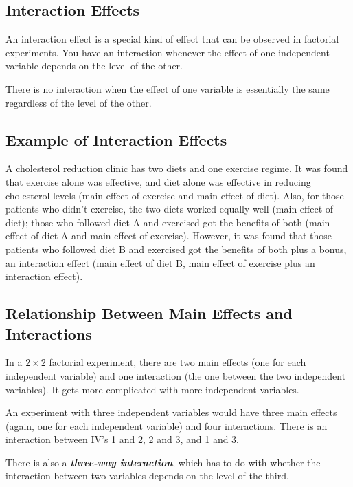 \documentclass[12pt]{article}
\begin{document}

\subsection*{Interaction Effects}
 
An interaction effect is a special kind of effect that can be observed in factorial experiments.  You have an interaction whenever the effect of one independent variable depends on the level of the other.  

There is no interaction when the effect of one variable is essentially the same regardless of the level of the other. 

\subsection*{Example of Interaction Effects}
A cholesterol reduction clinic has two diets and one exercise regime. It was found that exercise alone was effective, and diet alone was effective in reducing cholesterol levels (main effect of exercise and main effect of diet). Also, for those patients who didn't exercise, the two diets worked equally well (main effect of diet); those who followed diet A and exercised got the benefits of both (main effect of diet A and main effect of exercise). However, it was found that those patients who followed diet B and exercised got the benefits of both plus a bonus, an interaction effect (main effect of diet B, main effect of exercise plus an interaction effect).

\subsection*{Relationship Between Main Effects and Interactions}
 
In a $2\times 2$ factorial experiment, there are two main effects (one for each independent variable) and one interaction (the one between the two independent variables).  It gets more complicated with more independent variables. 

 An experiment with three independent variables would have three main effects (again, one for each independent variable) and four interactions.  There is an interaction between IV’s 1 and 2, 2 and 3, and 1 and 3.  

There is also a \textit{\textbf{three-way interaction}}, which has to do with whether the interaction between two variables depends on the level of the third.
\end{document}
